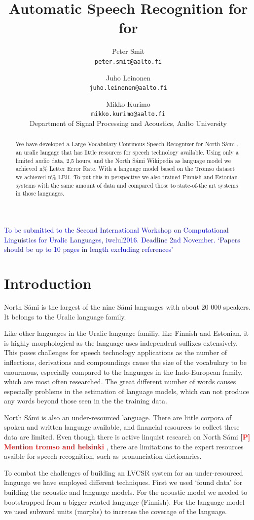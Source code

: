\documentclass[b5paper]{article}
\title{Automatic Speech Recognition for  for \ns}
\author{Peter Smit \\ \texttt{peter.smit@aalto.fi} \and Juho Leinonen \\ \texttt{juho.leinonen@aalto.fi} \and Mikko Kurimo\\ \texttt{mikko.kurimo@aalto.fi}  \\
[0.5cm]Department of Signal Processing and Acoustics, Aalto University\\}
\newcommand{\todo}[2]{{\textcolor{red}{\bf [#1] #2 }}}
\newcommand{\note}[1]{{\textcolor{blue}{#1}}}
\newcommand{\ns}{{North Sámi }}
\begin{document}
\maketitle

\begin{abstract} We have developed a Large Vocabulary Continous Speech Recognizer for \ns, an uralic langage that has little resources for speech technology available. Using only a limited audio data, 2,5 hours, and the \ns Wikipedia as language model we achieved n\% Letter Error Rate. With a language model based on the Trömso dataset we achieved n\% LER. To put this in perspective we also trained Finnish and Estonian systems with the same amount of data and compared those to state-of-the art systems in those languages.   \end{abstract}

\note{To be submitted to the Second International Workshop on Computational Linguistics for Uralic Languages, iwclul2016. Deadline 2nd November. `Papers should be up to 10 pages in length excluding references'}
\section{Introduction}

\ns is the largest of the nine Sámi languages with about 20 000 speakers. It belongs to the Uralic language family.

Like other languages in the Uralic language familiy, like Finnish and Estonian, it is highly morphological as the language uses independent suffixes extensively. This poses challenges for speech technology applications as the number of inflections, derivations and compoundings cause the size of the vocabulary to be enourmous, especially compared to the languages in the Indo-European family, which are most often researched. The great different number of words causes especially problems in the estimation of language models, which can not produce any words beyond those seen in the the training data. 

\ns is also an under-resourced language. There are little corpora of spoken and written language available, and financial resources to collect these data are limited. Even though there is active linquist research on \ns \todo{P}{Mention tromso and helsinki}, there are limitations to the expert resources avaible for speech recognition, such as pronunciation dictionaries. 

To combat the challenges of building an LVCSR system for an under-resourced language we have employed different techniques. First we used `found data' for building the acoustic and language models. For the acoustic model we needed to bootstrapped from a bigger related language (Finnish). For the language model we used subword units (morphs) to increase the coverage of the language.
\end{document}
